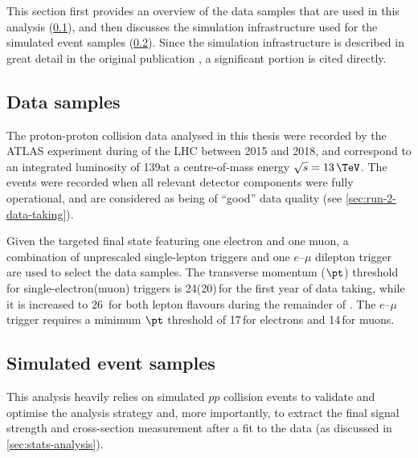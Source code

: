 %

This section first provides an overview of the data samples that are used in this analysis (\cref{subsec:data-samples}), and then discusses the simulation infrastructure used for the simulated event samples (\cref{subsec:simulated-event-samples}).
Since the simulation infrastructure is described in great detail in the original publication , a significant portion is cited directly. 

\subsection{Data samples}
\label{subsec:data-samples}
The proton-proton collision data analysed in this thesis were recorded by the ATLAS experiment during \RunTwo of the LHC between 2015 and 2018, and correspond to an integrated luminosity of 139\ifb at a centre-of-mass energy $\sqrt{s} = 13\,\TeV$. 
The events were recorded when all relevant detector components were fully operational, and are considered as being of ``good'' data quality (see \cref{sec:run-2-data-taking}).

Given the targeted final state featuring one electron and one muon, a combination of unprescaled single-lepton triggers and one $e$--$\mu$ dilepton trigger~\cite{TRIG-2018-05,TRIG-2018-01} are used to select the data samples. 
The transverse momentum ($\pt$) threshold for single-electron(muon) triggers is 24(20)\,\GeV for the first year of data taking, while it is increased to 26~\GeV for both lepton flavours during the remainder of \RunTwo.\cite{PLACEHOLDER:FOR:PAPER}
The $e$--$\mu$ trigger requires a minimum $\pt$ threshold of 17\,\GeV for electrons and 14\,\GeV for muons.\cite{PLACEHOLDER:FOR:PAPER}


\subsection{Simulated event samples}
\label{subsec:simulated-event-samples}

This analysis heavily relies on simulated $pp$ collision events to validate and optimise the analysis strategy and, more importantly, to extract the final signal strength and cross-section measurement after a fit to the data (as discussed in \cref{sec:stats-analysis}). 

